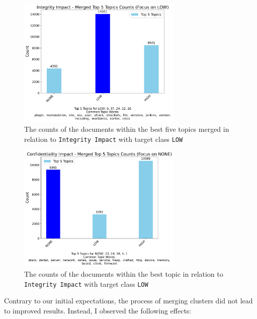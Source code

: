 \documentclass[12pt]{article}
\begin{document}
\begin{figure}[H]
	\centering
	\includegraphics[width=0.7\textwidth]{figures/integrityImpact/merged_top_k_topics_category_focus_counts_integrityImpact_LOW_k5.pdf}
	\caption{The counts of the documents within the best five topics merged in relation to \texttt{Integrity
			Impact} with
		target class \texttt{LOW}}

	\label{fig:integrityImpact_60_NONE_merged}
\end{figure}

\begin{figure}[ht]
	\centering
	\includegraphics[width=0.7\textwidth]{figures/confidentialityImpact/merged_top_k_topics_category_focus_counts_confidentialityImpact_NONE_k5.pdf}
	\caption{The counts of the documents within the best topic in relation to \texttt{Integrity Impact} with target class \texttt{LOW}}
	\label{fig:confidentialityImpact_60_LOW_merged}
\end{figure}

Contrary to our initial expectations, the process of merging clusters did not lead to improved
results. Instead, I observed the following effects:
\end{document}
